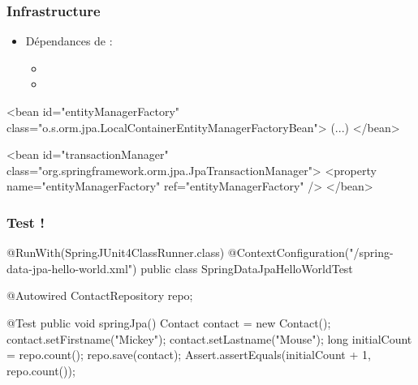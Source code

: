 \begin{frame}[fragile]
 \frametitle{Infrastructure}
 \begin{itemize}
  \item Dépendances de  :
  \begin{itemize}
   \item {}
   \item {}
   \end{itemize}
 \end{itemize}

\begin{xmlcode}
<bean id="entityManagerFactory"
      class="o.s.orm.jpa.LocalContainerEntityManagerFactoryBean">
  (...)
</bean>

<bean id="transactionManager" 
      class="org.springframework.orm.jpa.JpaTransactionManager">
  <property name="entityManagerFactory" ref="entityManagerFactory" />
</bean>
\end{xmlcode}

\end{frame}

\begin{frame}[fragile]
 \frametitle{Test !}

\begin{javacode}
@RunWith(SpringJUnit4ClassRunner.class)
@ContextConfiguration("/spring-data-jpa-hello-world.xml")
public class SpringDataJpaHelloWorldTest {

  @Autowired ContactRepository repo;

  @Test public void springJpa() {
    Contact contact = new Contact();
    contact.setFirstname("Mickey");
    contact.setLastname("Mouse");
    long initialCount = repo.count();
    repo.save(contact);
    Assert.assertEquals(initialCount + 1, repo.count());
  }

}
\end{javacode}

\end{frame}

